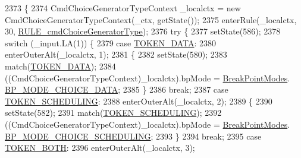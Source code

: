 \begin{DoxyCode}
2373                                                                                                   \{
2374     CmdChoiceGeneratorTypeContext \_localctx = \textcolor{keyword}{new} CmdChoiceGeneratorTypeContext(\_ctx, getState());
2375     enterRule(\_localctx, 30, \hyperlink{classgov_1_1nasa_1_1jpf_1_1inspector_1_1server_1_1expression_1_1parser_1_1_expression_grammar_parser_a4e1b1231e6750ceecb6bd5ce8e5df3c3}{RULE\_cmdChoiceGeneratorType});
2376     \textcolor{keywordflow}{try} \{
2377       setState(586);
2378       \textcolor{keywordflow}{switch} (\_input.LA(1)) \{
2379       \textcolor{keywordflow}{case} \hyperlink{classgov_1_1nasa_1_1jpf_1_1inspector_1_1server_1_1expression_1_1parser_1_1_expression_grammar_parser_a289e5f1af08e9240fa2dffa5ffb9bb22}{TOKEN\_DATA}:
2380         enterOuterAlt(\_localctx, 1);
2381         \{
2382         setState(580);
2383         match(\hyperlink{classgov_1_1nasa_1_1jpf_1_1inspector_1_1server_1_1expression_1_1parser_1_1_expression_grammar_parser_a289e5f1af08e9240fa2dffa5ffb9bb22}{TOKEN\_DATA});
2384          ((CmdChoiceGeneratorTypeContext)\_localctx).bpMode =  \hyperlink{enumgov_1_1nasa_1_1jpf_1_1inspector_1_1server_1_1breakpoints_1_1_break_point_modes}{BreakPointModes}.
      \hyperlink{enumgov_1_1nasa_1_1jpf_1_1inspector_1_1server_1_1breakpoints_1_1_break_point_modes_a9d72dd93aedc29e450b202ddf53869df}{BP\_MODE\_CHOICE\_DATA}; 
2385         \}
2386         \textcolor{keywordflow}{break};
2387       \textcolor{keywordflow}{case} \hyperlink{classgov_1_1nasa_1_1jpf_1_1inspector_1_1server_1_1expression_1_1parser_1_1_expression_grammar_parser_ad7c1983d75440cdcd8659d2559fd4c0a}{TOKEN\_SCHEDULING}:
2388         enterOuterAlt(\_localctx, 2);
2389         \{
2390         setState(582);
2391         match(\hyperlink{classgov_1_1nasa_1_1jpf_1_1inspector_1_1server_1_1expression_1_1parser_1_1_expression_grammar_parser_ad7c1983d75440cdcd8659d2559fd4c0a}{TOKEN\_SCHEDULING});
2392          ((CmdChoiceGeneratorTypeContext)\_localctx).bpMode =  \hyperlink{enumgov_1_1nasa_1_1jpf_1_1inspector_1_1server_1_1breakpoints_1_1_break_point_modes}{BreakPointModes}.
      \hyperlink{enumgov_1_1nasa_1_1jpf_1_1inspector_1_1server_1_1breakpoints_1_1_break_point_modes_a9debdc03839e4ea73695d7f206f6967c}{BP\_MODE\_CHOICE\_SCHEDULING}; 
2393         \}
2394         \textcolor{keywordflow}{break};
2395       \textcolor{keywordflow}{case} \hyperlink{classgov_1_1nasa_1_1jpf_1_1inspector_1_1server_1_1expression_1_1parser_1_1_expression_grammar_parser_adb1cf23ee91ded4bcbbba7860c7e27ff}{TOKEN\_BOTH}:
2396         enterOuterAlt(\_localctx, 3);

\end{DoxyCode}

